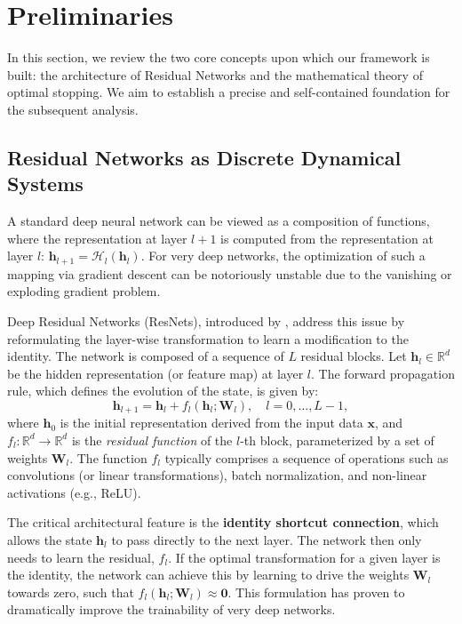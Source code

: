 \documentclass[12pt]{imsart}
\newcommand{\R}{\mathbb{R}}
\newcommand{\h}{\mathbf{h}}
\newcommand{\x}{\mathbf{x}}
\newcommand{\W}{\mathbf{W}}
\theoremstyle{plain}
\theoremstyle{definition}
\begin{document}
\section{Preliminaries}
\label{sec:prelim}
In this section, we review the two core concepts upon which our framework is built: the architecture of Residual Networks and the mathematical theory of optimal stopping. We aim to establish a precise and self-contained foundation for the subsequent analysis.

\subsection{Residual Networks as Discrete Dynamical Systems}
A standard deep neural network can be viewed as a composition of functions, where the representation at layer $l+1$ is computed from the representation at layer $l$: $\h_{l+1} = \mathcal{H}_l(\h_l)$. For very deep networks, the optimization of such a mapping via gradient descent can be notoriously unstable due to the vanishing or exploding gradient problem.

Deep Residual Networks (ResNets), introduced by \citet{He2016}, address this issue by reformulating the layer-wise transformation to learn a modification to the identity. The network is composed of a sequence of $L$ residual blocks. Let $\h_l \in \R^d$ be the hidden representation (or feature map) at layer $l$. The forward propagation rule, which defines the evolution of the state, is given by:
\begin{equation} \label{eq:resnet}
\h_{l+1} = \h_l + f_l(\h_l; \W_l), \quad l = 0, \dots, L-1,
\end{equation}
where $\h_0$ is the initial representation derived from the input data $\x$, and $f_l: \R^d \to \R^d$ is the \textit{residual function} of the $l$-th block, parameterized by a set of weights $\W_l$. The function $f_l$ typically comprises a sequence of operations such as convolutions (or linear transformations), batch normalization, and non-linear activations (e.g., ReLU).

The critical architectural feature is the \textbf{identity shortcut connection}, which allows the state $\h_l$ to pass directly to the next layer. The network then only needs to learn the residual, $f_l$. If the optimal transformation for a given layer is the identity, the network can achieve this by learning to drive the weights $\W_l$ towards zero, such that $f_l(\h_l; \W_l) \approx \mathbf{0}$. This formulation has proven to dramatically improve the trainability of very deep networks.
\end{document}
